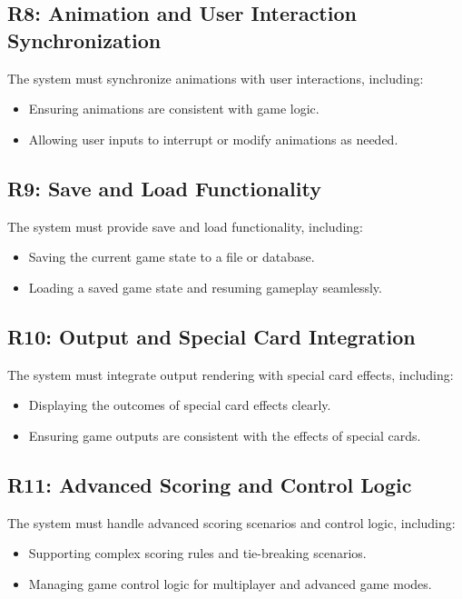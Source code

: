 \documentclass[12pt, titlepage]{article}
\begin{document}
\subsection{R8: Animation and User Interaction Synchronization}
The system must synchronize animations with user interactions, including:
\begin{itemize}
    \item Ensuring animations are consistent with game logic.
    \item Allowing user inputs to interrupt or modify animations as needed.
\end{itemize}

\subsection{R9: Save and Load Functionality}
The system must provide save and load functionality, including:
\begin{itemize}
    \item Saving the current game state to a file or database.
    \item Loading a saved game state and resuming gameplay seamlessly.
\end{itemize}

\subsection{R10: Output and Special Card Integration}
The system must integrate output rendering with special card effects, including:
\begin{itemize}
    \item Displaying the outcomes of special card effects clearly.
    \item Ensuring game outputs are consistent with the effects of special cards.
\end{itemize}

\subsection{R11: Advanced Scoring and Control Logic}
The system must handle advanced scoring scenarios and control logic, including:
\begin{itemize}
    \item Supporting complex scoring rules and tie-breaking scenarios.
    \item Managing game control logic for multiplayer and advanced game modes.
\end{itemize}
\end{document}
